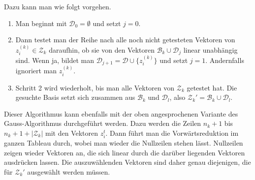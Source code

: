 Dazu kann man wie folgt vorgehen.
\begin{enumerate}
\item
Man beginnt mit $\mathcal{D}_0=\emptyset$ und setzt $j=0$.
\item
Dann testet man der Reihe nach alle noch nicht getesteten Vektoren
von $z_i^{(k)}\in\mathcal{Z}_k$ daraufhin, ob sie von den Vektoren
$\mathcal{B}_k\cup \mathcal{D}_j$ linear unabhängig sind.
Wenn ja, bildet man $\mathcal{D}_{j+1} = \mathcal{D}\cup\{z^{(k)}_i\}$ und
setzt $j=1$.
Andernfalls ignoriert man $z^{(k)}_i$.
\item
Schritt 2 wird wiederholt, bis man alle Vektoren von $\mathcal{Z}_k$
getestet hat.
Die gesuchte Basis setzt sich zusammen  aus $\mathcal{B}_k$ und
$\mathcal{D}_l$,
also
$
\mathcal{Z}_k'
=
\mathcal{B}_k
\cup
\mathcal{D}_l.
$
\end{enumerate}

Dieser Algorithmus kann ebenfalls mit der oben angesprochenen Variante
des Gauss-Algorithmus durchgeführt werden.
Dazu werden die Zeilen $n_k+1$ bis $n_k+1+|\mathcal{Z}_k|$ mit den
Vektoren $z_i^t$.
Dann führt man die Vorwärtsreduktion im ganzen Tableau durch, wobei
man wieder die Nullzeilen stehen lässt.
Nullzeilen zeigen wieder Vektoren an, die sich linear durch die darüber
liegenden Vektoren ausdrücken lassen.
Die auszuwählenden Vektoren sind daher genau diejenigen, die für
$\mathcal{Z}_k'$ ausgewählt werden müssen.


